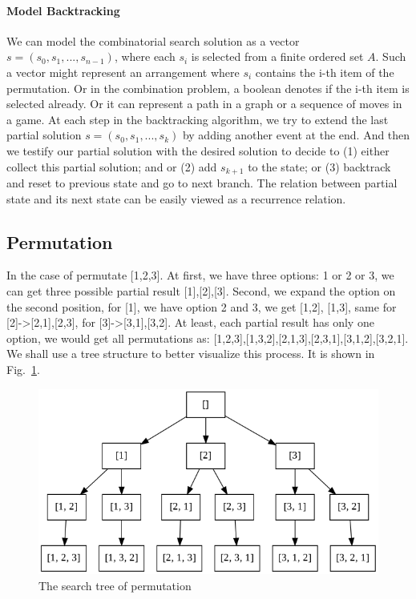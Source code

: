 \documentclass[../main.tex]{subfiles}
\begin{document}
\paragraph{Model Backtracking}
We can model the combinatorial search solution as a vector $s = (s_0, s_1, ..., s_{n-1})$, where each $s_i$ is selected from a finite ordered set $A$. Such a vector might represent an arrangement where $s_i$ contains the i-th item of the permutation. Or in the combination problem, a boolean denotes if the i-th item is selected already. Or it can represent a path in a graph or a sequence of moves in a game. At each step in the backtracking algorithm, we try to extend the last partial solution $s = (s_0, s_1, ..., s_{k})$ by adding another event at the end. And then we testify our partial solution with the desired solution to decide to (1) either collect this partial solution; and or (2) add $s_{k+1}$ to the state; or (3) backtrack and reset to previous state and go to next branch.  The relation between partial state and its next state can be easily viewed as a recurrence relation. 





\subsection{Permutation}
In the case of permutate [1,2,3]. At first, we have three options: 1 or 2 or 3, we can get three possible partial result [1],[2],[3]. Second, we expand the option on the second position, for [1], we have option 2 and 3, we get [1,2], [1,3], same for [2]->[2,1],[2,3], for [3]->[3,1],[3,2]. At least, each partial result has only one option, we would get all permutations as: [1,2,3],[1,3,2],[2,1,3],[2,3,1],[3,1,2],[3,2,1]. We shall use a tree structure to better visualize this process. It is shown in Fig.~\ref{fig:backtrack_permutation}. 
\begin{figure}[h]
    \centering
    \includegraphics[width= 0.8\columnwidth]{fig/permutation.png}
    \caption{The search tree of permutation}
    \label{fig:backtrack_permutation}
\end{figure}
\end{document}
